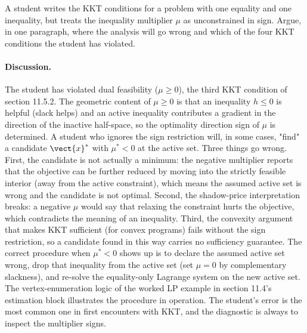 \begin{exercise}
A student writes the KKT conditions for a problem with one equality
and one inequality, but treats the inequality multiplier $\mu$ as
unconstrained in sign. Argue, in one paragraph, where the analysis
will go wrong and which of the four KKT conditions the student has
violated.

\paragraph{Discussion.} The student has violated dual feasibility
($\mu \geq 0$), the third KKT condition of section 11.5.2. The
geometric content of $\mu \geq 0$ is that an inequality $h \leq 0$
is helpful (slack helps) and an active inequality contributes a
gradient in the direction of the inactive half-space, so the
optimality direction sign of $\mu$ is determined. A student who
ignores the sign restriction will, in some cases, "find" a
candidate $\vect{x}^{*}$ with $\mu^{*} < 0$ at the active set.
Three things go wrong. First, the candidate is not actually a
minimum: the negative multiplier reports that the objective can be
further reduced by moving into the strictly feasible interior
(away from the active constraint), which means the assumed active
set is wrong and the candidate is not optimal. Second, the
shadow-price interpretation breaks: a negative $\mu$ would say
that relaxing the constraint hurts the objective, which contradicts
the meaning of an inequality. Third, the convexity argument that
makes KKT sufficient (for convex programs) fails without the sign
restriction, so a candidate found in this way carries no
sufficiency guarantee. The correct procedure when $\mu^{*} < 0$
shows up is to declare the assumed active set wrong, drop that
inequality from the active set (set $\mu = 0$ by complementary
slackness), and re-solve the equality-only Lagrange system on the
new active set. The vertex-enumeration logic of the worked LP
example in section 11.4's estimation block illustrates the
procedure in operation. The student's error is the most common
one in first encounters with KKT, and the diagnostic is always
to inspect the multiplier signs.
\end{exercise}

